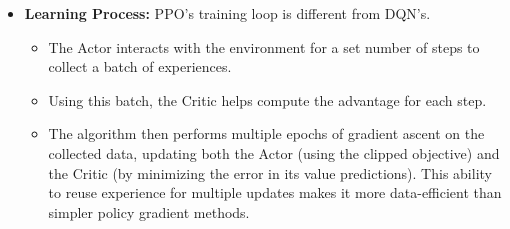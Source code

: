 \begin{itemize}
    \item \textbf{Learning Process:} PPO's training loop is different from DQN's.
    \begin{itemize}
        \item The Actor interacts with the environment for a set number of steps to collect a batch of experiences.
        \item Using this batch, the Critic helps compute the advantage for each step.
        \item The algorithm then performs multiple epochs of gradient ascent on the collected data, updating both the Actor (using the clipped objective) and the Critic (by minimizing the error in its value predictions). This ability to reuse experience for multiple updates makes it more data-efficient than simpler policy gradient methods.
    \end{itemize}
\end{itemize}